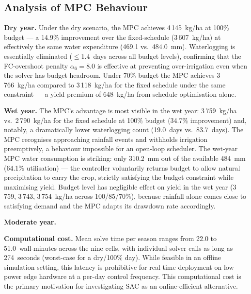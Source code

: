 \subsection{Analysis of MPC Behaviour}

\textbf{Dry year.}
Under the dry scenario, the MPC achieves 4\,145~kg/ha at 100\% budget — a 14.9\%
improvement over the fixed-schedule (3\,607~kg/ha) at effectively the same water
expenditure (469.1 vs.\ 484.0~mm).
Waterlogging is essentially eliminated ($\leq 1.4$~days across all budget levels),
confirming that the FC-overshoot penalty $\alpha_6 = 8.0$ is effective at preventing
over-irrigation even when the solver has budget headroom.
Under 70\% budget the MPC achieves 3\,766~kg/ha compared to 3\,118~kg/ha for the
fixed schedule under the same constraint — a yield premium of 648~kg/ha from
schedule optimisation alone.

\textbf{Wet year.}
The MPC's advantage is most visible in the wet year: 3\,759~kg/ha vs.\ 2\,790~kg/ha
for the fixed schedule at 100\% budget (34.7\% improvement) and, notably, a dramatically
lower waterlogging count (19.0~days vs.\ 83.7~days).
The MPC recognises approaching rainfall events and withholds irrigation preemptively,
a behaviour impossible for an open-loop scheduler.
The wet-year MPC water consumption is striking: only 310.2~mm out of the available
484~mm (64.1\% utilisation) — the controller voluntarily returns budget to allow natural
precipitation to carry the crop, strictly satisfying the budget constraint while
maximising yield.
Budget level has negligible effect on yield in the wet year (3\,759, 3\,743,
3\,754~kg/ha across 100/85/70\%), because rainfall alone comes close to satisfying
demand and the MPC adapts its drawdown rate accordingly.

\textbf{Moderate year.}

\textbf{Computational cost.}
Mean solve time per season ranges from 22.0 to 51.0~wall-minutes across the nine cells,
with individual solver calls as long as 274~seconds (worst-case for a dry/100\% day).
While feasible in an offline simulation setting, this latency is prohibitive for
real-time deployment on low-power edge hardware at a per-day control frequency.
This computational cost is the primary motivation for investigating SAC as an
online-efficient alternative.

